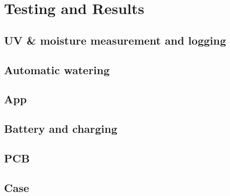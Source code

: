 \graphicspath{{testing/fig/}}

\chapter{Testing and Results}
\label{chap:testing}

\section{UV \& moisture measurement and logging}

\section{Automatic watering}

\section{App}

\section{Battery and charging}

\section{PCB}

\section{Case}